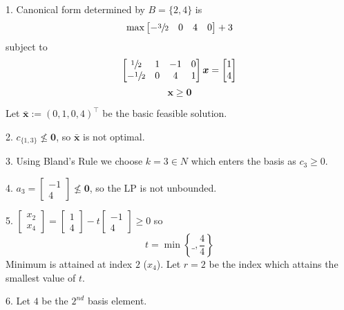 \begin{exbox}
\begin{example}
        1. Canonical form determined by $ B=\{2,4\} $ is
        \[ \max
            \begin{bmatrix}
                -\sfrac{3}{2} & 0 & 4 & 0
            \end{bmatrix} + 3\]
        subject to
        \[
            \begin{bmatrix}
                \sfrac{1}{2}  & 1 & -1 & 0 \\
                -\sfrac{1}{2} & 0 & 4  & 1
            \end{bmatrix}\bm{x}=
            \begin{bmatrix}
                1 \\
                4
            \end{bmatrix}
        \]
        \[ \bm{x}\geqslant  \bm{0} \]

        Let $ \bm{\bar{x}}:=(0,1,0,4)^\top $ be the basic feasible solution.

        2. $ c_{\{1,3\}} \nleq \bm{0} $, so $ \bm{\bar{x}} $ is not optimal.

        3. Using Bland's Rule we choose $ k=3\in N $ which enters the basis
        as $ c_3\geqslant  0 $.

        4.
        $
            a_3= \begin{bmatrix}
                -1 \\
                4
            \end{bmatrix}\nleq \bm{0}
        $,
        so the LP is not unbounded.

        5.
        $
            \begin{bmatrix}
                x_2 \\
                x_4
            \end{bmatrix}
            =
            \begin{bmatrix}
                1 \\
                4
            \end{bmatrix}-t
            \begin{bmatrix}
                -1 \\
                4
            \end{bmatrix}\geqslant  0
        $
        so
        \[ t=\min \left\{\_,\frac{4}{4} \right\} \]
        Minimum is attained at index $ 2 $ ($ x_4 $). Let $ r=2 $ be the index which attains the smallest value of $ t $.

        6. Let $ 4 $ be the $ 2^{nd} $ basis element.


\end{example}
\end{exbox}
